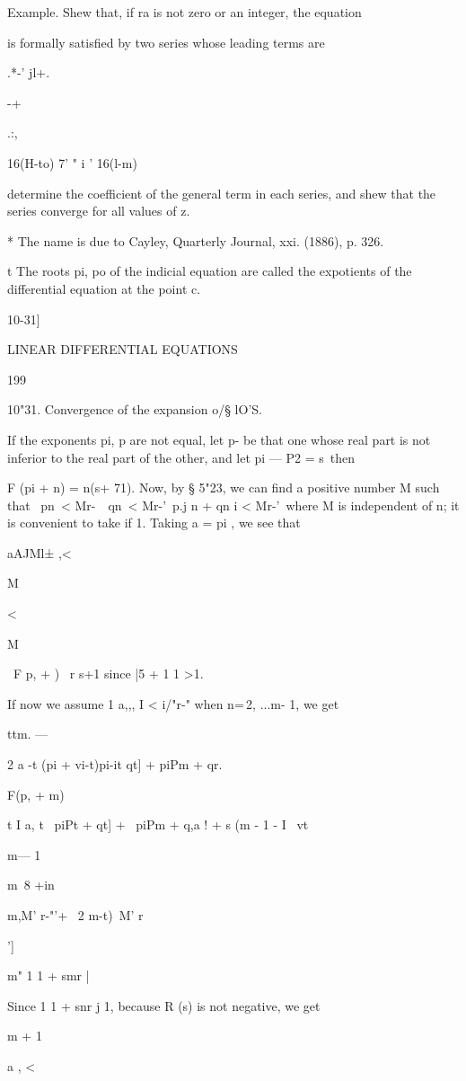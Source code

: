 Example. Shew that, if ra is not zero or an integer, the equation

is formally satisfied by two series whose leading terms are

.*-' jl+.

-+

.:,

16(H-to) 7' " i ' 16(l-m)

determine the coefficient of the general term in each series, and shew
that the series converge for all values of z.

* The name is due to Cayley, Quarterly Journal, xxi. (1886), p. 326.

t The roots pi, po of the indicial equation are called the expotients
of the differential equation at the point c.

10-31]

LINEAR DIFFERENTIAL EQUATIONS

199

10"31. Convergence of the expansion o/§ lO'S.

If the exponents pi, p are not equal, let p- be that one whose real
part is not inferior to the real part of the other, and let pi — P2 =
s\ then

F (pi + n) = n(s+ 71). Now, by § 5"23, we can find a positive number M
such that \ pn\ < Mr-\ \ qn\ < Mr-'\ p.j n + qn i < Mr-'\ where M is
independent of n; it is convenient to take if 1. Taking a = pi , we
see that

aAJMl± ,<

M

<

M

\ F p, + ) \ r s+1 since |5 + 1 1 >1.

If now we assume 1 a,,, I < i/"r-" when n=\,2, ...m- 1, we get

ttm. —

2 a -t (pi + vi-t)pi-it qt] + piPm + qr.

F(p, + m)

t I a, t \ piPt + qt] + \ piPm + q,a ! + s (m - 1 - I \ vt

m— 1

m\ 8 +in\

m,M' r-"'+ \ 2 m-t)\ M' r

']

m" 1 1 + smr |

Since 1 1 + snr j 1, because R (s) is not negative, we get

m + 1

a , <


